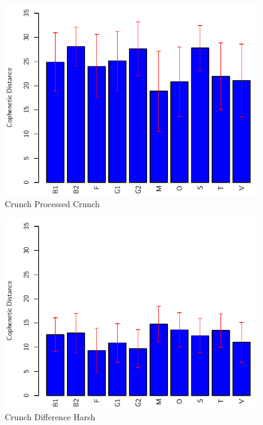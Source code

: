 		\begin{figure}[h!]
			\centering
			\includegraphics{chapter7/Images/CrunchProcessedCrunchBar.pdf}
			\caption{Crunch Processed Crunch}
		\end{figure}

		\begin{figure}[h!]
			\centering
			\includegraphics{chapter7/Images/CrunchDifferenceHarshBar.pdf}
			\caption{Crunch Difference Harsh}
		\end{figure}

